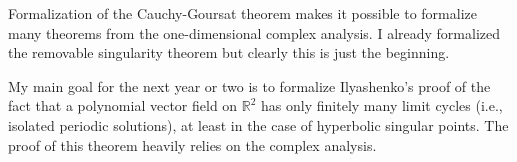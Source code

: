 \documentclass[a4paper,UKenglish,cleveref, autoref, thm-restate]{lipics-v2021}
\newcommand{\bbR}{\mathbb{R}}
\begin{document}
Formalization of the Cauchy-Goursat theorem makes it possible to
formalize many theorems from the one-dimensional complex analysis. I
already formalized the removable singularity theorem but clearly this
is just the beginning.

My main goal for the next year or two is to formalize Ilyashenko's
proof of the fact that a polynomial vector field on \(\bbR^{2}\) has
only finitely many limit cycles (i.e., isolated periodic solutions),
at least in the case of hyperbolic singular points. The proof of this
theorem heavily relies on the complex analysis.


\end{document}
